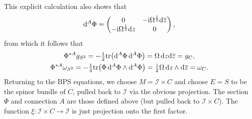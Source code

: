 \documentclass[10pt,a4paper]{amsart}
\newcommand{\II}{{\mathcal{I}}}
\newcommand{\1}{{\mathbb{1}}}
\def \d{\mathrm{d}}
\newcommand{\ol}{\overline}
\newcommand{\tr}{{\operatorname{tr}}}
\numberwithin{equation}{section}
\begin{document}
This explicit calculation also shows that
\begin{equation}
\label{spinorial dPhi}
\d^A\Phi = \begin{pmatrix}0&-{\rm i}\Omega^{\frac12}\d\ol{z} \\-{\rm i}\Omega^{\frac12}\d z&0\end{pmatrix},
\end{equation}
from which it follows that
\begin{gather*}
\Phi^{\ast A}g_{S^2} = -\tfrac12\tr\bigl(\d^A\Phi\,\d^A\Phi\bigr)=\Omega\,\d z\d\ol{z}=g_{C},\\
\Phi^{\ast A}\omega_{S^2} = -\tfrac14\tr\bigl(\Phi\,\d^A\Phi\wedge \d^A\Phi\bigr)=\tfrac{{\rm i}}{2}\Omega\,\d z\wedge\d\ol{z}=\omega_{C}.
\end{gather*}
Returning to the BPS equations, we choose $M=\II\times C$ and choose $E=S$ to be the spinor bundle of $C$, pulled back to $\II$ via the obvious projection. The section $\Phi$ and connection $A$ are those defined above (but pulled back to $\II\times C$). The function $\xi\colon \II\times C\to \II$ is just projection onto the first factor.
\end{document}
